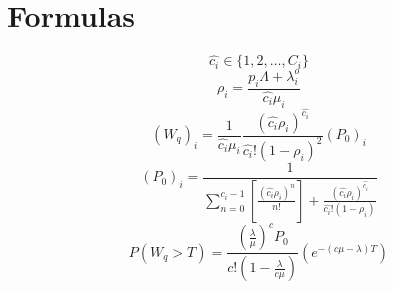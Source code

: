\section{Formulas}

\[ \hat{c_i} \in \{1,2, \dots, C_i\} \]
\[ \rho_i = \frac{p_i \Lambda + \lambda_i^o}{\hat{c_i}\mu_i} \]
\[ (W_q)_i = \frac{1}{\hat{c_i} \mu_i} 
\frac{(\hat{c_i} \rho_i)^{\hat{c_i}}}{\hat{c_i}!(1-\rho_i)^2}(P_0)_i \]
\[ (P_0)_i = \frac{1}{\sum_{n = 0}^{\hat{c_i} - 1} \left[ 
    \frac{(\hat{c_i} \rho_i)^n}{n!} \right] + 
    \frac{(\hat{c_i}\rho_i)^{\hat{c_i}}}{\hat{c_i}!(1-\rho_i)}} \]
\[ P(W_q > T) = \frac{(\frac{\lambda}{\mu})^c P_0}{c!(1-\frac{\lambda}{c \mu})} 
(e^{-(c \mu - \lambda)T}) \]